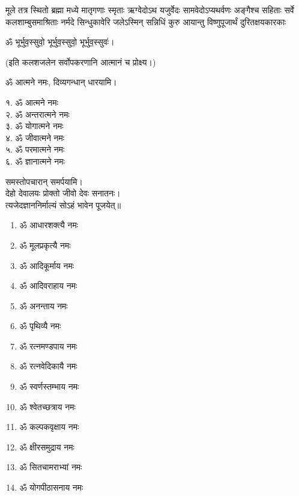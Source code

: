 {मूले तत्र स्थितो ब्रह्मा मध्ये मातृगणाः स्मृताः}
{ऋग्वेदोऽथ यजुर्वेदः सामवेदोऽप्यथर्वणः}
{अङ्गैश्च सहिताः सर्वे कलशाम्बुसमाश्रिताः}
{नर्मदे सिन्धुकावेरि जलेऽस्मिन् सन्निधिं कुरु}
{आयान्तु विष्णुपूजार्थं दुरितक्षयकारकाः}

\centerline{ॐ भूर्भुव॒स्सुवो॒ भूर्भुव॒स्सुवो॒ भूर्भुव॒स्सुवः॑।}

(इति कलशजलेन सर्वोपकरणानि आत्मानं च प्रोक्ष्य।)

ॐ आत्मने नमः, दिव्यगन्धान् धारयामि।
\begin{multicols}{2}
१. ॐ आत्मने नमः\\
२. ॐ अन्तरात्मने नमः\\
३. ॐ योगात्मने नमः\\
४. ॐ जीवात्मने नमः\\
५. ॐ परमात्मने नमः\\
६. ॐ ज्ञानात्मने नमः
\end{multicols}
समस्तोपचारान् समर्पयामि।\\

देहो देवालयः प्रोक्तो जीवो देवः सनातनः।\\
त्यजेदज्ञाननिर्माल्यं सोऽहं भावेन पूजयेत्॥\\

\begin{multicols}{2}
\begin{enumerate}
\item ॐ आधारशक्त्यै नमः
\item ॐ मूलप्रकृत्यै नमः
\item ॐ आदिकूर्माय नमः 
\item ॐ आदिवराहाय नमः
\item ॐ अनन्ताय नमः
\item ॐ पृथिव्यै नमः
\item ॐ रत्नमण्डपाय नमः
\item ॐ रत्नवेदिकायै नमः
\item ॐ स्वर्णस्तम्भाय नमः
\item ॐ श्वेतच्छत्राय नमः
\item ॐ कल्पकवृक्षाय नमः
\item ॐ क्षीरसमुद्राय नमः 
\item ॐ सितचामराभ्यां नमः
\item ॐ योगपीठासनाय नमः
\end{enumerate}
\end{multicols}

